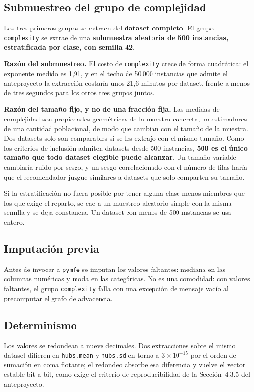 \documentclass[11pt,letterpaper]{article}
\begin{document}
\subsection{Submuestreo del grupo de complejidad}

Los tres primeros grupos se extraen del \textbf{dataset completo}. El grupo
\texttt{complexity} se extrae de una \textbf{submuestra aleatoria de 500
instancias, estratificada por clase, con semilla 42}.

\textbf{Razón del submuestreo.} El costo de \texttt{complexity} crece de forma
cuadrática: el exponente medido es 1,91, y en el techo de 50\,000 instancias que
admite el anteproyecto la extracción costaría unos 21,6 minutos por dataset,
frente a menos de tres segundos para los otros tres grupos juntos.

\textbf{Razón del tamaño fijo, y no de una fracción fija.} Las medidas de
complejidad son propiedades geométricas de la muestra concreta, no estimadores de
una cantidad poblacional, de modo que cambian con el tamaño de la muestra. Dos
datasets solo son comparables si se les extrajo con el mismo tamaño. Como los
criterios de inclusión admiten datasets desde 500 instancias, \textbf{500 es el
único tamaño que todo dataset elegible puede alcanzar}. Un tamaño variable
cambiaría ruido por sesgo, y un sesgo correlacionado con el número de filas haría
que el recomendador juzgue similares a datasets que solo comparten su tamaño.

Si la estratificación no fuera posible por tener alguna clase menos miembros que
los que exige el reparto, se cae a un muestreo aleatorio simple con la misma
semilla y se deja constancia. Un dataset con menos de 500 instancias se usa
entero.

\subsection{Imputación previa}

Antes de invocar a \texttt{pymfe} se imputan los valores faltantes: mediana en las
columnas numéricas y moda en las categóricas. No es una comodidad: con valores
faltantes, el grupo \texttt{complexity} falla con una excepción de mensaje vacío
al precomputar el grafo de adyacencia.

\subsection{Determinismo}

Los valores se redondean a nueve decimales. Dos extracciones sobre el mismo
dataset difieren en \texttt{hubs.mean} y \texttt{hubs.sd} en torno a
$3 \times 10^{-15}$ por el orden de sumación en coma flotante; el redondeo
absorbe esa diferencia y vuelve el vector estable bit a bit, como exige el
criterio de reproducibilidad de la Sección~4.3.5 del anteproyecto.
\end{document}
